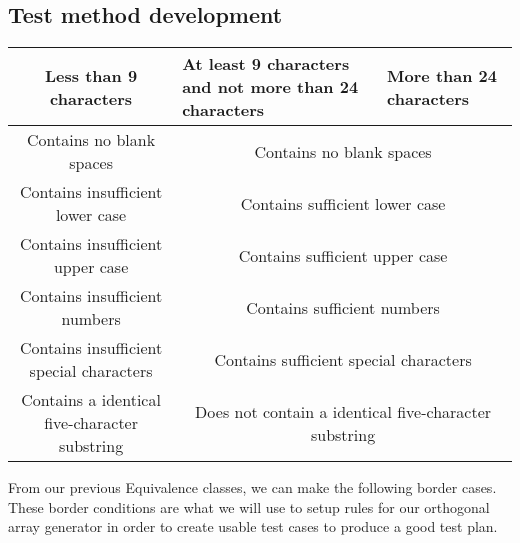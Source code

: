 \documentclass[12pt,letterpaper]{article}
\begin{document}
\subsection{Test method development}

\begin{center}

    
  \begin{tabular}{||c|m{4cm}|m{5cm}||}
  \hline
  Less than 9 characters & At least 9 characters and not more than 24
  characters & More than 24 characters \\
  
  \hline \hline
  \multicolumn{1}{||c|}{Contains no blank spaces} & \multicolumn{2}{c||}{Contains no blank spaces} \\
  
  \hline \hline
  \multicolumn{1}{||c|}{Contains insufficient lower case} 
  & \multicolumn{2}{c||}{Contains sufficient lower case} \\
  
  \hline \hline
  \multicolumn{1}{||c|}{Contains insufficient upper case} 
  & \multicolumn{2}{c||}{Contains sufficient upper case} \\
  
  \hline \hline
  \multicolumn{1}{||c|}{Contains insufficient numbers} 
  & \multicolumn{2}{c||}{Contains sufficient numbers} \\
  
  \hline \hline
  \multicolumn{1}{||c|}{Contains insufficient special characters} 
  & \multicolumn{2}{c||}{Contains sufficient special characters} \\
   
  \hline \hline
  \multicolumn{1}{||c|}{Contains a identical five-character substring}
  & \multicolumn{2}{c||}{Does not contain a identical five-character substring} \\
  \hline
  \end{tabular}
\end{center}
  
From our previous Equivalence classes, we can make the following border cases. These border conditions
are what we will use to setup rules for our orthogonal array generator in order to create usable test
cases to produce a good test plan.
\end{document}
